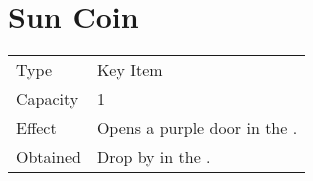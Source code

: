 \section{Sun Coin}
\label{item:sun_coin}


\noindent\begin{tabularx}{\textwidth}[l]{lX}
	Type
	& Key Item
\\
	Capacity
	& 1
\\
	Effect
	& Opens a purple door in the \nameref{map:focus_tower}.
\\
	Obtained
	& Drop by \nameref{monster:dualhead_hydra} in the \nameref{map:lava_dome}.
\end{tabularx}
